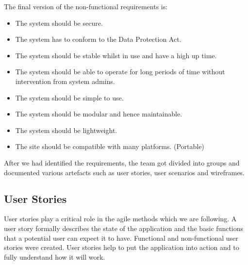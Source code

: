 \documentclass{l3proj}
\begin{document}
The final version of the non-functional requirements is:

\begin{itemize}

\item The system should be secure.

\item The system has to conform to the Data Protection Act.

\item The system should be stable whilst in use and have a high up time.

\item The system should be able to operate for long periods of time without intervention from system admins.

\item The system should be simple to use.

\item The system should be modular and hence maintainable.

\item The system should be lightweight.

\item The site should be compatible with many platforms. (Portable)

\end{itemize}

After we had identified the requirements, the team got divided into groups and documented various artefacts such as user stories, user scenarios and wireframes.

\subsection{User Stories}
\label{user_stories}

User stories \cite{UserStories} play a critical role in the agile methods which we are following. A user story formally describes the state of the application and the basic functions that a potential user can expect it to have. Functional and non-functional user stories were created. User stories help to put the application into action and to fully understand how it will work.
\end{document}
